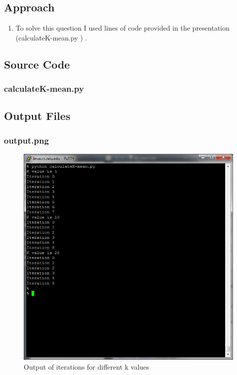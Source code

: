 \documentclass[12pt]{article}
\begin{document}
\subsection{Approach}
\begin{enumerate}
    \item To solve this question I used lines of code provided in the presentation (calculateK-mean.py ) .
    \end{enumerate}

\subsection{Source Code}
\subsubsection{calculateK-mean.py}

\newpage

\subsection{Output Files}
\subsubsection{output.png}
\begin{figure}[ht]
\includegraphics[scale=1.0]{../Q3/output}
\centering
\caption{Output of iterations for different k values }
\label{fig:blogclust}
\end{figure}
\newpage
\end{document}
